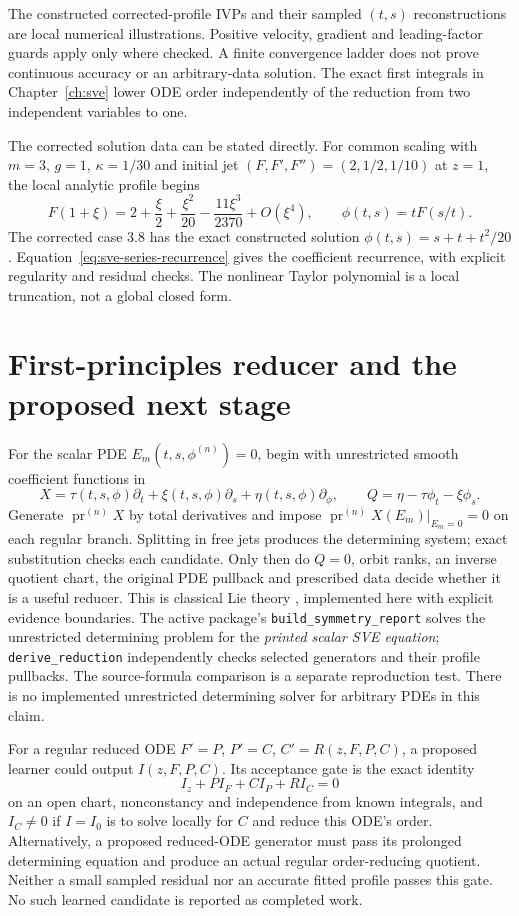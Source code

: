 \documentclass[12pt,a4paper,oneside]{report}
\numberwithin{equation}{chapter}
\newcommand{\pr}{\operatorname{pr}}
\DeclareRobustCommand{\code}[1]{\nolinkurl{#1}}
\begin{document}
The constructed corrected-profile IVPs and their sampled $(t,s)$
reconstructions are local numerical illustrations. Positive velocity,
gradient and leading-factor guards apply only where checked. A finite
convergence ladder does not prove continuous accuracy or an arbitrary-data
solution. The exact first integrals in Chapter~\ref{ch:sve} lower ODE order
independently of the reduction from two independent variables to one.

The corrected solution data can be stated directly. For common scaling with
$m=3$, $g=1$, $\kappa=1/30$ and initial jet $(F,F',F'')=(2,1/2,1/10)$
at $z=1$, the local analytic profile begins
\[
 F(1+\xi)=2+\frac{\xi}{2}+\frac{\xi^2}{20}
                -\frac{11\xi^3}{2370}+O(\xi^4),\qquad
 \phi(t,s)=tF(s/t).
\]
The corrected case 3.8 has the exact constructed solution
$\phi(t,s)=s+t+t^2/20$. Equation~\eqref{eq:sve-series-recurrence} gives the
coefficient recurrence, with explicit regularity and residual checks. The
nonlinear Taylor polynomial is a local truncation, not a global closed form.

\section{First-principles reducer and the proposed next stage}
For the scalar PDE $E_m(t,s,\phi^{(n)})=0$, begin with unrestricted smooth
coefficient functions in
\begin{equation}\label{eq:dissertation-master}
 X=\tau(t,s,\phi)\partial_t+\xi(t,s,\phi)\partial_s
   +\eta(t,s,\phi)\partial_\phi,\qquad
 Q=\eta-\tau\phi_t-\xi\phi_s.
\end{equation}
Generate $\pr^{(n)}X$ by total derivatives and impose
$\pr^{(n)}X(E_m)|_{E_m=0}=0$ on each regular branch. Splitting in free jets
produces the determining system; exact substitution checks each candidate.
Only then do $Q=0$, orbit ranks, an inverse quotient chart, the original
PDE pullback and prescribed data decide whether it is a useful reducer.
This is classical Lie theory \cite{olver1986,oliveri2026}, implemented here
with explicit evidence boundaries. The active package's
\code{build_symmetry_report} solves the unrestricted determining problem for
the \emph{printed scalar SVE equation}; \code{derive_reduction} independently
checks selected generators and their profile pullbacks. The source-formula
comparison is a separate reproduction test. There is no implemented
unrestricted determining solver for arbitrary PDEs in this claim.

For a regular reduced ODE $F'=P$, $P'=C$, $C'=R(z,F,P,C)$, a proposed learner
could output $I(z,F,P,C)$. Its acceptance gate is the exact identity
\begin{equation}\label{eq:dissertation-learned-I}
 I_z+P I_F+C I_P+R I_C=0
\end{equation}
on an open chart, nonconstancy and independence from known integrals, and
$I_C\ne0$ if $I=I_0$ is to solve locally for $C$ and reduce this ODE's order.
Alternatively, a proposed reduced-ODE generator must pass its prolonged
determining equation and produce an actual regular order-reducing quotient.
Neither a small sampled residual nor an accurate fitted profile passes this
gate. No such learned candidate is reported as completed work.
\end{document}

